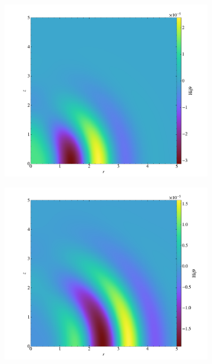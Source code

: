 \begin{figure}[h!]
\begin{subfigure}{.5\textwidth}
  \centering
  \includegraphics[width=\linewidth]{result_hij_0020.pdf}
  \label{fig:hij9_2}
\end{subfigure}%
\begin{subfigure}{.5\textwidth}
  \centering
  \includegraphics[width=\linewidth]{result_hij_0030.pdf}
  \label{fig:hij9_3}
\end{subfigure}%


\end{figure}
